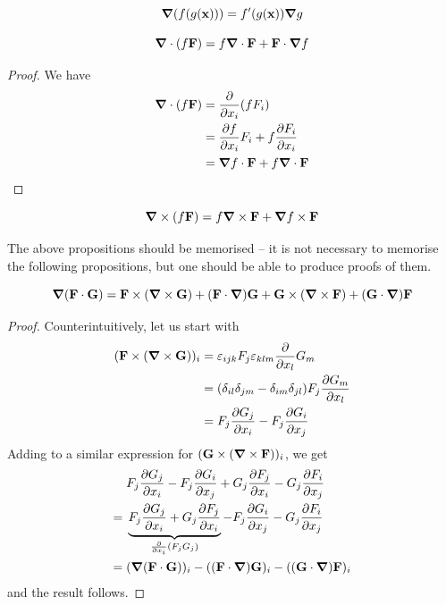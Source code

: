 \documentclass{../../template/note}
\begin{document}
    \begin{proposition}
        \[
            \grad(f(g(\V x))) = f'(g(\V x))\grad g
        \]
    \end{proposition}

    \begin{proposition}
        \label{2.5}\[
            \grad\cdot (f \V F) = f \grad \cdot \V F + \V F \cdot \grad f
        \]
    \end{proposition}

    \begin{proof}
        We have
        \begin{align*}
            \grad \cdot (f \V F) &= \pd{}{x_i}(fF_i) \\
            &= \pd{f}{x_i}F_i + f\pd{F_i}{x_i} \\
            &= \grad f \cdot \V F + f \grad \cdot \V F
        \end{align*}
    \end{proof}
    
    \begin{proposition}
        \[
            \grad \times (f \V F) = f \grad \times \V F + \grad f \times \V F
        \]
    \end{proposition}

    The above propositions should be memorised -- it is not necessary to memorise the following propositions, but one should be able to produce proofs of them.
    
    \begin{proposition}
        \[
            \grad(\V F \cdot \V G) = \V F \times (\grad \times \V G) + (\V F \cdot \grad) \V G + \V G \times (\grad \times \V F) + (\V G \cdot \grad)\V F
        \]
    \end{proposition}
    
    \begin{proof}
        Counterintuitively, let us start with
        \begin{align*}
            (\V F \times (\grad \times \V G))_i &= \lv{ijk}F_j\lv{klm}\pd{}{x_l}G_m \\
            &= (\delta_{il}\delta_{jm}-\delta_{im}\delta_{jl})F_j \pd{G_m}{x_l} \\
            &= F_j \pd{G_j}{x_i} - F_j \pd{G_i}{x_j}
        \end{align*}
        Adding to a similar expression for \((\V G \times (\grad \times \V F))_i\), we get
        \begin{align*}
            &\;F_j \pd{G_j}{x_i} - F_j \pd{G_i}{x_j} + G_j \pd{F_j}{x_i} - G_j \pd{F_i}{x_j} \\
            =&\; \underbrace{F_j \pd{G_j}{x_i} + G_j \pd{F_j}{x_i}}_{\pd{}{x_i}(F_jG_j)} - F_j \pd{G_i}{x_j} - G_j \pd{F_i}{x_j} \\
            =&\; (\grad(\V F \cdot \V G))_i - ((\V F \cdot \grad)\V G)_i - ((\V G \cdot \grad)\V F)_i
        \end{align*}
        and the result follows.
    \end{proof}
\end{document}

